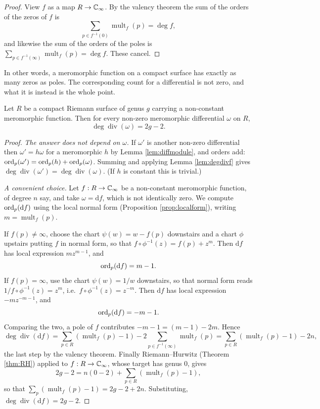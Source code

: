\documentclass[a4paper]{scrartcl}
\newcommand{\Cinf}{\C_\infty}
\newcommand{\mult}{\operatorname{mult}}
\newcommand{\Div}{\operatorname{div}}
\begin{document}
\begin{proof}
	View $f$ as a map $R \to \Cinf$. By the valency theorem the sum of the orders of the
	zeros of $f$ is
	$$
	\sum_{p \in f^{-1}(0)}\mult_f(p) = \deg f,
	$$
	and likewise the sum of the orders of the poles is
	$\sum_{p\in f^{-1}(\infty)}\mult_f(p) = \deg f$. These cancel.
\end{proof}

In other words, a meromorphic function on a compact surface has exactly as many zeros as
poles. The corresponding count for a differential is not zero, and what it is instead is
the whole point.

\begin{theorem}\label{thm:canonicaldegree}
	Let $R$ be a compact Riemann surface of genus $g$ carrying a non-constant meromorphic
	function. Then for every non-zero meromorphic differential $\omega$ on $R$,
	$$
	\deg\Div(\omega) = 2g - 2.
	$$
\end{theorem}

\begin{proof}
	\emph{The answer does not depend on $\omega$.} If $\omega'$ is another non-zero
	differential then $\omega' = h\omega$ for a meromorphic $h$ by Lemma
	\ref{lem:diffmodule}, and orders add: $\operatorname{ord}_p(\omega') = \operatorname{ord}_p(h) + \operatorname{ord}_p(\omega)$.
	Summing and applying Lemma \ref{lem:degdivf} gives
	$\deg\Div(\omega') = \deg\Div(\omega)$. (If $h$ is constant this is trivial.)

	\emph{A convenient choice.} Let $f : R \to \Cinf$ be a non-constant meromorphic
	function, of degree $n$ say, and take $\omega = \mathrm{d}f$, which is not identically zero.
	We compute $\operatorname{ord}_p(\mathrm{d}f)$ using the local normal form (Proposition
	\ref{prop:localform}), writing $m = \mult_f(p)$.

	If $f(p) \neq \infty$, choose the chart $\psi(w) = w - f(p)$ downstairs and a chart
	$\phi$ upstairs putting $f$ in normal form, so that
	$f\circ\phi^{-1}(z) = f(p) + z^m$. Then $\mathrm{d}f$ has local expression $mz^{m-1}$, and
	$$
	\operatorname{ord}_p(\mathrm{d}f) = m - 1.
	$$
	If $f(p) = \infty$, use the chart $\psi(w) = 1/w$ downstairs, so that normal form reads
	$1/f\circ\phi^{-1}(z) = z^m$, i.e.\ $f\circ\phi^{-1}(z) = z^{-m}$. Then $\mathrm{d}f$ has
	local expression $-mz^{-m-1}$, and
	$$
	\operatorname{ord}_p(\mathrm{d}f) = -m-1.
	$$
	Comparing the two, a pole of $f$ contributes $-m-1 = (m-1) - 2m$. Hence
	$$
	\deg\Div(\mathrm{d}f) = \sum_{p\in R}\left(\mult_f(p)-1\right)
	- 2\!\!\sum_{p\in f^{-1}(\infty)}\!\!\mult_f(p)
	= \sum_{p\in R}\left(\mult_f(p)-1\right) - 2n,
	$$
	the last step by the valency theorem. Finally Riemann--Hurwitz (Theorem \ref{thm:RH})
	applied to $f : R \to \Cinf$, whose target has genus $0$, gives
	$$
	2g-2 = n(0 - 2) + \sum_{p\in R}\left(\mult_f(p)-1\right),
	$$
	so that $\sum_p(\mult_f(p)-1) = 2g-2+2n$. Substituting, $\deg\Div(\mathrm{d}f) = 2g-2$.
\end{proof}
\end{document}
